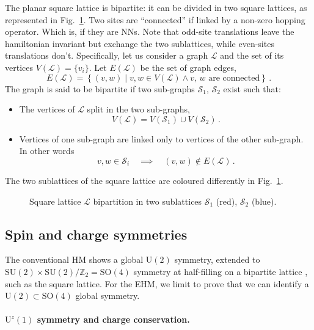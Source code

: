 The planar square lattice is bipartite: it can be divided in two square lattices, as represented in Fig.~\ref{fig:square-sublattices}. Two sites are ``connected'' if linked by a non-zero hopping operator. Which is, if they are NNs. Note that odd-site translations leave the hamiltonian invariant but exchange the two sublattices, while even-sites translations don't. Specifically, let us consider a graph $\mathcal{L}$ and the set of its vertices $V(\mathcal{L}) = \lbrace v_i \rbrace$. Let $E(\mathcal{L})$ be the set of graph edges,
\[
	E(\mathcal{L}) = \left\lbrace (v,w) \mid v,w \in V(\mathcal{L}) \land \text{$v$, $w$ are connected} \right\rbrace \, .
\]
The graph is said to be bipartite if two sub-graphs $\mathcal{S}_1$, $\mathcal{S}_2$ exist such that:
\begin{itemize}
	\item The vertices of $\mathcal{L}$ split in the two sub-graphs,
	\[
		V(\mathcal{L}) = V(\mathcal{S}_1) \cup V(\mathcal{S}_2) \, .
	\]
	\item Vertices of one sub-graph are linked only to vertices of the other sub-graph. In other words
	\[
		v,w \in \mathcal{S}_i
		\quad\implies\quad
		(v,w) \notin E(\mathcal{L}) \, .
	\]
\end{itemize}
The two sublattices of the square lattice are coloured differently in Fig.~\ref{fig:square-sublattices}.

\begin{figure}
	\centering
	
	\caption{Square lattice $\mathcal{L}$ bipartition in two sublattices $\mathcal{S}_1$ (red), $\mathcal{S}_2$ (blue).}
	\label{fig:square-sublattices}
\end{figure}

\subsection{Spin and charge symmetries}\label{subsec:spin-charge-syms}

The conventional HM shows a global $\mathrm{U}(2)$ symmetry, extended to $\mathrm{SU}(2) \times \mathrm{SU}(2) / \mathbb{Z}_2 = \mathrm{SO}(4)$ symmetry at half-filling on a bipartite lattice \cite{arovas2022hubbard}, such as the square lattice. For the EHM, we limit to prove that we can identify a $\mathrm{U}(2) \subset \mathrm{SO}(4)$ global symmetry.

\paragraph{$\mathrm{U}^z(1)$ symmetry and charge conservation.} 

